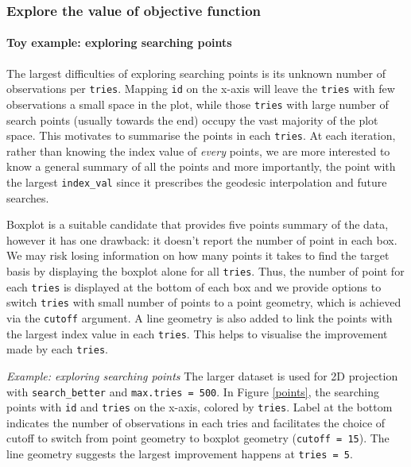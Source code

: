 \documentclass[12pt]{article}
\begin{document}
\hypertarget{static}{%
\subsubsection{Explore the value of objective function}\label{static}}

\hypertarget{toy-example-exploring-searching-points}{%
\paragraph{Toy example: exploring searching
points}\label{toy-example-exploring-searching-points}}

The largest difficulties of exploring searching points is its unknown
number of observations per \texttt{tries}. Mapping \texttt{id} on the
x-axis will leave the \texttt{tries} with few observations a small space
in the plot, while those \texttt{tries} with large number of search
points (usually towards the end) occupy the vast majority of the plot
space. This motivates to summarise the points in each \texttt{tries}. At
each iteration, rather than knowing the index value of \emph{every}
points, we are more interested to know a general summary of all the
points and more importantly, the point with the largest
\texttt{index\_val} since it prescribes the geodesic interpolation and
future searches.

Boxplot is a suitable candidate that provides five points summary of the
data, however it has one drawback: it doesn't report the number of point
in each box. We may risk losing information on how many points it takes
to find the target basis by displaying the boxplot alone for all
\texttt{tries}. Thus, the number of point for each \texttt{tries} is
displayed at the bottom of each box and we provide options to switch
\texttt{tries} with small number of points to a point geometry, which is
achieved via the \texttt{cutoff} argument. A line geometry is also added
to link the points with the largest index value in each \texttt{tries}.
This helps to visualise the improvement made by each \texttt{tries}.

\emph{Example: exploring searching points} The larger dataset is used
for 2D projection with \texttt{search\_better} and
\texttt{max.tries\ =\ 500}. In Figure \ref{points}, the searching points
with \texttt{id} and \texttt{tries} on the x-axis, colored by
\texttt{tries}. Label at the bottom indicates the number of observations
in each tries and facilitates the choice of cutoff to switch from point
geometry to boxplot geometry (\texttt{cutoff\ =\ 15}). The line geometry
suggests the largest improvement happens at \texttt{tries\ =\ 5}.
\end{document}
